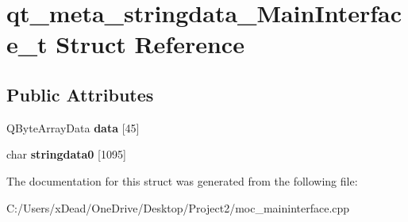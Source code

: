 \hypertarget{structqt__meta__stringdata___main_interface__t}{}\section{qt\+\_\+meta\+\_\+stringdata\+\_\+\+Main\+Interface\+\_\+t Struct Reference}
\label{structqt__meta__stringdata___main_interface__t}
\subsection*{Public Attributes}
\begin{DoxyCompactItemize}
\item 
\mbox{\label{structqt__meta__stringdata___main_interface__t_a2cb4dc15ac28f74acbbe2fa87922b137}} 
Q\+Byte\+Array\+Data {\bfseries data} \mbox{[}45\mbox{]}
\item 
\mbox{\label{structqt__meta__stringdata___main_interface__t_a142f2cef1263a12def314232a89d49ed}} 
char {\bfseries stringdata0} \mbox{[}1095\mbox{]}
\end{DoxyCompactItemize}


The documentation for this struct was generated from the following file\+:\begin{DoxyCompactItemize}
\item 
C\+:/\+Users/x\+Dead/\+One\+Drive/\+Desktop/\+Project2/moc\+\_\+maininterface.\+cpp\end{DoxyCompactItemize}
